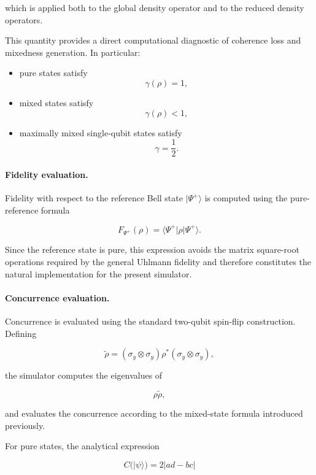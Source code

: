which is applied both to the global density operator and to the reduced density operators.

\medskip

This quantity provides a direct computational diagnostic of coherence loss and mixedness generation. In particular:

\begin{itemize}
    \item pure states satisfy
    \[
    \gamma(\rho)=1,
    \]
    \item mixed states satisfy
    \[
    \gamma(\rho)<1,
    \]
    \item maximally mixed single-qubit states satisfy
    \[
    \gamma=\frac{1}{2}.
    \]
\end{itemize}

\medskip

\paragraph{Fidelity evaluation.}

Fidelity with respect to the reference Bell state \( |\Psi^+\rangle \) is computed using the pure-reference formula

\[
F_{\Psi^+}(\rho)
=
\langle\Psi^+|
\rho
|\Psi^+\rangle.
\]

Since the reference state is pure, this expression avoids the matrix square-root operations required by the general Uhlmann fidelity and therefore constitutes the natural implementation for the present simulator.

\medskip

\paragraph{Concurrence evaluation.}

Concurrence is evaluated using the standard two-qubit spin-flip construction. Defining

\[
\tilde{\rho}
=
(\sigma_y\otimes\sigma_y)
\rho^*
(\sigma_y\otimes\sigma_y),
\]

the simulator computes the eigenvalues of

\[
\rho\tilde{\rho},
\]

and evaluates the concurrence according to the mixed-state formula introduced previously.

\medskip

For pure states, the analytical expression

\[
C(|\psi\rangle)
=
2|ad-bc|
\]

